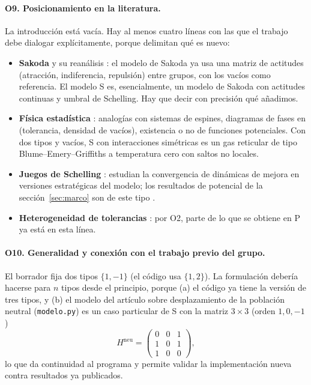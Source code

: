 \documentclass[11pt,a4paper]{article}
\theoremstyle{plain}
\theoremstyle{definition}
\theoremstyle{remark}
\newcommand{\modP}{\textsf{P}}
\newcommand{\modS}{\textsf{S}}
\begin{document}
\paragraph{O9. Posicionamiento en la literatura.}
La introducción está vacía. Hay al menos cuatro líneas con las que el trabajo
debe dialogar explícitamente, porque delimitan qué es nuevo:
\begin{itemize}
  \item \textbf{Sakoda} \cite{Sakoda1971,Hegselmann2017} y su reanálisis
  \cite{Goles2017,Goles2020}: el modelo de Sakoda ya usa una matriz de
  actitudes (atracción, indiferencia, repulsión) entre grupos, con los vacíos
  como referencia. El modelo \modS{} es, esencialmente, un modelo de Sakoda con
  actitudes continuas y umbral de Schelling. Hay que decir con precisión qué
  añadimos.
  \item \textbf{Física estadística} \cite{Vinkovic2006,DallAsta2008,
  Gauvin2009,Grauwin2009,Castellano2009}: analogías con sistemas de espines,
  diagramas de fases en (tolerancia, densidad de vacíos), existencia o no de
  funciones potenciales. Con dos tipos y vacíos, \modS{} con interacciones
  simétricas es un gas reticular de tipo Blume--Emery--Griffiths
  \cite{BEG1971} a temperatura cero con saltos no locales.
  \item \textbf{Juegos de Schelling} \cite{Chauhan2018,Echzell2019,
  Elkind2019}: estudian la convergencia de dinámicas de mejora en versiones
  estratégicas del modelo; los resultados de potencial de la
  sección~\ref{sec:marco} son de este tipo \cite{MondererShapley1996}.
  \item \textbf{Heterogeneidad de tolerancias}
  \cite{HatnaBenenson2012,HatnaBenenson2015,AcunaGoles2025}: por O2, parte de
  lo que se obtiene en \modP{} ya está en esta línea.
\end{itemize}

\paragraph{O10. Generalidad y conexión con el trabajo previo del grupo.}
El borrador fija dos tipos $\{1,-1\}$ (el código usa $\{1,2\}$). La
formulación debería hacerse para $n$ tipos desde el principio, porque (a) el
código ya tiene la versión de tres tipos, y (b) el modelo del artículo sobre
desplazamiento de la población neutral (\texttt{modelo.py}) es un caso
particular de \modS{} con la matriz $3\times3$ (orden $1,0,-1$)
\[
  H^{\mathrm{neu}}=\begin{pmatrix}0&0&1\\1&0&1\\1&0&0\end{pmatrix},
\]
lo que da continuidad al programa y permite validar la implementación nueva
contra resultados ya publicados.
\end{document}
